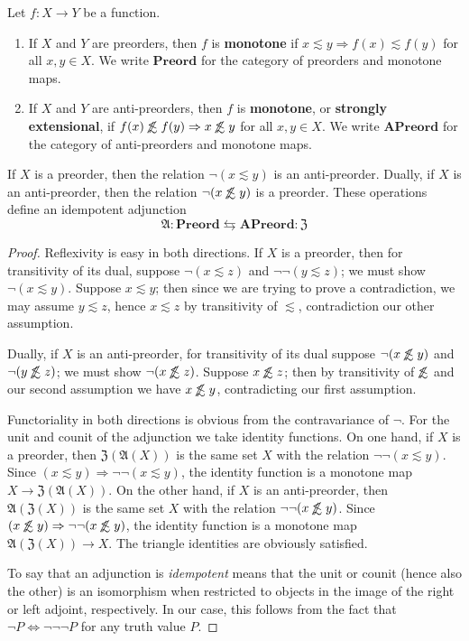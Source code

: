 \documentclass{article}
\def\oapt{\mathrel{\!\not\,\not\lesssim}}
\def\leapx{\lesssim}
\let\implies\Rightarrow
\def\anti{\mathfrak{A}}
\def\neigh{\mathfrak{Z}}
\def\Preord{\mathbf{Preord}}
\def\APreord{\mathbf{APreord}}
\begin{document}
\begin{defn}
  Let $f:X\to Y$ be a function.
  \begin{enumerate}
  \item If $X$ and $Y$ are preorders, then $f$ is \textbf{monotone} if $x\leapx y \implies f(x)\leapx f(y)$ for all $x,y\in X$.
    We write $\Preord$ for the category of preorders and monotone maps.
  \item If $X$ and $Y$ are anti-preorders, then $f$ is \textbf{monotone}, or \textbf{strongly extensional}, if $f(x)\oapt f(y) \implies x\oapt y$ for all $x,y\in X$.
    We write $\APreord$ for the category of anti-preorders and monotone maps.
  \end{enumerate}
\end{defn}

\begin{thm}\label{thm:ord-le-apt}
  If $X$ is a preorder, then the relation $\neg(x\leapx y)$ is an anti-preorder.
  Dually, if $X$ is an anti-preorder, then the relation $\neg(x\oapt y)$ is a preorder.
  These operations define an idempotent adjunction
  \[\anti : \Preord \leftrightarrows \APreord : \neigh\]
\end{thm}
\begin{proof}
  Reflexivity is easy in both directions.
  If $X$ is a preorder, then for transitivity of its dual, suppose $\neg(x\leapx z)$ and $\neg\neg(y\leapx z)$; we must show $\neg(x\leapx y)$.
  Suppose $x\leapx y$; then since we are trying to prove a contradiction, we may assume $y\leapx z$, hence $x\leapx z$ by transitivity of $\leapx$, contradiction our other assumption.

  Dually, if $X$ is an anti-preorder, for transitivity of its dual suppose $\neg (x\oapt y)$ and $\neg (y\oapt z)$; we must show $\neg(x\oapt z)$.
  Suppose $x\oapt z$; then by transitivity of $\oapt$ and our second assumption we have $x\oapt y$, contradicting our first assumption.

  Functoriality in both directions is obvious from the contravariance of $\neg$.
  For the unit and counit of the adjunction we take identity functions.
  On one hand, if $X$ is a preorder, then $\neigh(\anti(X))$ is the same set $X$ with the relation $\neg\neg(x\leapx y)$.
  Since $(x\leapx y) \implies \neg\neg(x\leapx y)$, the identity function is a monotone map $X\to \neigh(\anti(X))$.
  On the other hand, if $X$ is an anti-preorder, then $\anti(\neigh(X))$ is the same set $X$ with the relation $\neg\neg(x\oapt y)$.
  Since $(x\oapt y) \implies \neg\neg(x\oapt y)$, the identity function is a monotone map $\anti(\neigh(X)) \to X$.
  The triangle identities are obviously satisfied.

  To say that an adjunction is \emph{idempotent} means that the unit or counit (hence also the other) is an isomorphism when restricted to objects in the image of the right or left adjoint, respectively.
  In our case, this follows from the fact that $\neg P \iff \neg\neg\neg P$ for any truth value $P$.
\end{proof}
\end{document}
